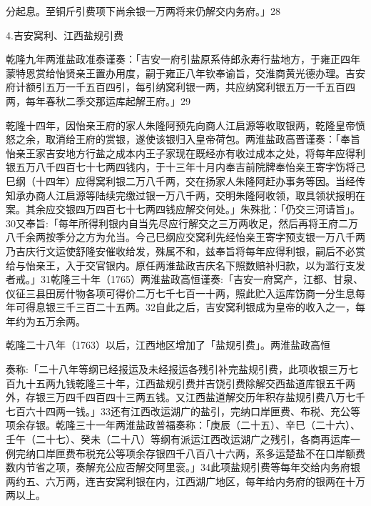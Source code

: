 \noindent 分起息。至铜斤引费项下尚余银一万两将来仍解交内务府。」28

4.吉安窝利、江西盐规引费

乾隆九年两淮盐政准泰谨奏：「吉安一府引盐原系侍郎永寿行盐地方，于雍正四年蒙特恩赏给怡贤亲王置办用度，嗣于雍正八年钦奉谕旨，交淮商黄光德办理。吉安府计额引五万一千五百四引，每引纳窝利银一两，共应纳窝利银五万一千五百四两，每年春秋二季交那运库起解王府。」29

乾隆十四年，因怡亲王府的家人朱隆阿预先向商人江启源等收取银两，乾隆皇帝愤怒之余，取消给王府的赏银，遂使该银归入皇帝荷包。两淮盐政高晋谨奏：「奉旨怡亲王家吉安地方行盐之成本内王子家现在既经亦有收过成本之处，将每年应得利银五万八千四百七十七两四钱内，于十三年十月内奉吉前院牌奉怡亲王寄字饬将己巳纲（十四年）应得窝利银二万八千两，交在扬家人朱隆阿赶办事务等因。当经传知承办商人江启源等陆续完缴过银一万八千两，交明朱隆阿收领，取具领状报明在案。其余应交银四万四百七十七两四钱应解交何处。」朱殊批：「仍交三河请旨」。30又奉旨:「每年所得利银内自当先尽应行解交之三万两收足，然后再将王府二万八千余两按季分之方为允当。今己巳纲应交窝利先经怡亲王寄字预支银一万八千两乃吉庆行文运使舒隆安催收给发，殊属不和，兹奉旨将每年应得利银，嗣后不必赏给与怡亲王，入于交官银内。原任两淮盐政吉庆名下照数赔补归款，以为滥行支发者戒。」31乾隆三十年（1765）两淮盐政高恒谨奏:「吉安一府窝产，江都、甘泉、仪征三县田房什物各项可得价二万七千七百一十两，照此贮入运库饬商一分生息每年可得息银三千三百二十五两。32自此之后，吉安窝利银成为皇帝的收入之一，每年约为五万余两。

乾隆二十八年（1763）以后，江西地区增加了「盐规引费」。两淮盐政高恒

\vfill
\begin{BookNotes}
\end{BookNotes}

\noindent 奏称:「二十八年等纲已经报运及未经报运各残引补完盐规引费，此项收银三万七百九十五两九钱乾隆三十年，江西盐规引费并吉饶引费除解交西盐道库银五千两外，存银三万四千四百四十三两五钱。又江西盐道解交历年积存盐规引费八万七千七百六十四两一钱。」33还有江西改运湖广的盐引，完纳口岸匣费、布税、充公等项余存银。乾隆三十一年两淮盐政普福奏称：「庚辰（二十五）、辛巳（二十六）、壬午（二十七）、癸未（二十八）等纲有派运江西改运湖广之残引，各商再运库一例完纳口岸匣费布税充公等项余存银四千八百八十六两，系多运楚盐不在口岸额费数内节省之项，奏解充公应否解交阿里衮。」34此项盐规引费等每年交给内务府银两约五、六万两，连吉安窝利银在内，江西湖广地区，每年给内务府的银两在十万两以上。

